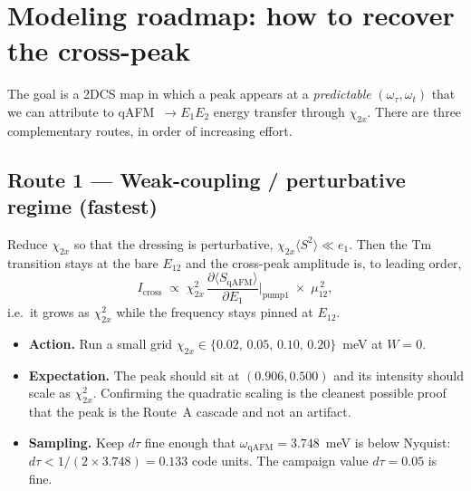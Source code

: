 \documentclass[11pt,a4paper]{article}
\newcommand{\qAFM}{\mathrm{qAFM}}
\newcommand{\EtA}{E_{12}}
\newcommand{\chitwox}{\chi_{2x}}
\begin{document}
\section{Modeling roadmap: how to recover the cross-peak}

The goal is a 2DCS map in which a peak appears at a \emph{predictable}
$(\omega_\tau,\omega_t)$ that we can attribute to qAFM~$\to E_1E_2$ energy
transfer through $\chitwox$. There are three complementary routes, in order of
increasing effort.

\subsection{Route 1 --- Weak-coupling / perturbative regime (fastest)}
Reduce $\chitwox$ so that the dressing is perturbative,
$\chitwox\langle S^2\rangle \ll e_1$. Then the Tm transition stays at the bare
$\EtA$ and the cross-peak amplitude is, to leading order,
\begin{equation}
  I_{\text{cross}}\;\propto\;\chitwox^{2}\,
  \frac{\partial \langle S_{\qAFM}\rangle}{\partial E_1}\Big|_{\text{pump1}}
  \;\times\;\mu_{12}^{\,2},
\end{equation}
i.e.\ it grows as $\chitwox^2$ while the frequency stays pinned at $\EtA$.
\begin{itemize}[nosep]
  \item \textbf{Action.} Run a small grid
        $\chitwox \in \{0.02,\,0.05,\,0.10,\,0.20\}$~meV at $W=0$.
  \item \textbf{Expectation.} The peak should sit at $(0.906,0.500)$ and its
        intensity should scale as $\chitwox^2$. Confirming the quadratic scaling
        is the cleanest possible proof that the peak is the Route~A cascade and
        not an artifact.
  \item \textbf{Sampling.} Keep $d\tau$ fine enough that
        $\omega_{\qAFM}=3.748$~meV is below Nyquist:
        $d\tau < 1/(2\times3.748)=0.133$ code units. The campaign value
        $d\tau=0.05$ is fine.
\end{itemize}
\end{document}
